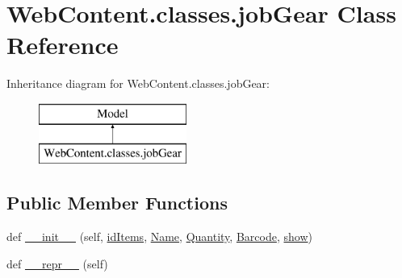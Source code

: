 \hypertarget{class_web_content_1_1classes_1_1job_gear}{}\section{Web\+Content.\+classes.\+job\+Gear Class Reference}
\label{class_web_content_1_1classes_1_1job_gear}
Inheritance diagram for Web\+Content.\+classes.\+job\+Gear\+:\begin{figure}[H]
\begin{center}
\leavevmode
\includegraphics[height=2.000000cm]{class_web_content_1_1classes_1_1job_gear}
\end{center}
\end{figure}
\subsection*{Public Member Functions}
\begin{DoxyCompactItemize}
\item 
def \hyperlink{class_web_content_1_1classes_1_1job_gear_a65e8cf098ecea70db55ad9bd0a3639e2}{\+\_\+\+\_\+init\+\_\+\+\_\+} (self, \hyperlink{class_web_content_1_1classes_1_1job_gear_a3c06d5a64cb18ce600a7e015d7ad7e2e}{id\+Items}, \hyperlink{class_web_content_1_1classes_1_1job_gear_ac24ca34d6bcaedda98f1711e0733c8ed}{Name}, \hyperlink{class_web_content_1_1classes_1_1job_gear_ad4f9a871b8c10bcdc1e3921b313620ca}{Quantity}, \hyperlink{class_web_content_1_1classes_1_1job_gear_aa99b6c99df4ef2686d9a7ae05839e870}{Barcode}, \hyperlink{class_web_content_1_1classes_1_1job_gear_ac60ca08b7517caefae54fd99e8c2f854}{show})
\item 
def \hyperlink{class_web_content_1_1classes_1_1job_gear_a366770b8baf200be438b1a6d5bebf72b}{\+\_\+\+\_\+repr\+\_\+\+\_\+} (self)
\end{DoxyCompactItemize}
